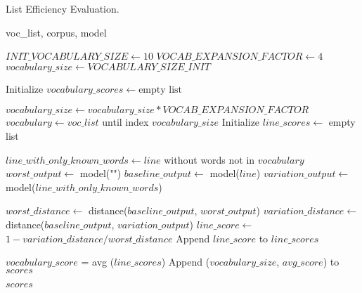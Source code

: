\begin{algorithm}[H]
\caption{List Efficiency Evaluation.}
\label{alg:efficiency-evaluation}
\begin{algorithmic}[1]
\Require voc\_list, corpus, model

\State $INIT\_VOCABULARY\_SIZE \gets 10$ 
\State $VOCAB\_EXPANSION\_FACTOR \gets 4$    
\State $vocabulary\_size \gets VOCABULARY\_SIZE\_INIT$ 

\State Initialize $vocabulary\_scores \gets \text{empty list}$

    \State $vocabulary\_size \gets vocabulary\_size * VOCAB\_EXPANSION\_FACTOR$ 
    \State $vocabulary \gets voc\_list$ until index $vocabulary\_size$
    \State Initialize $line\_scores \gets$ empty list
    
        \State $line\_with\_only\_known\_words \gets line $ without words not in $vocabulary$
        \State $worst\_output \gets$ model("")
        \State $baseline\_output \gets$ model($line$)
        \State $variation\_output \gets$ model($line\_with\_only\_known\_words$)

        \State $worst\_distance \gets$ distance($baseline\_output $, $worst\_output$)
        \State $variation\_distance \gets$ distance($baseline\_output $, $variation\_output$)
        \State $line\_score \gets$ $ 1 - variation\_distance / worst\_distance$
        \State Append $line\_score$ to $line\_scores$
    \EndFor

    \State $vocabulary\_score$ = avg ($line\_scores$)
    \State Append ($vocabulary\_size$, $avg\_score$) to $scores$
\EndWhile

\State \Return $scores$

\end{algorithmic}
\end{algorithm}
